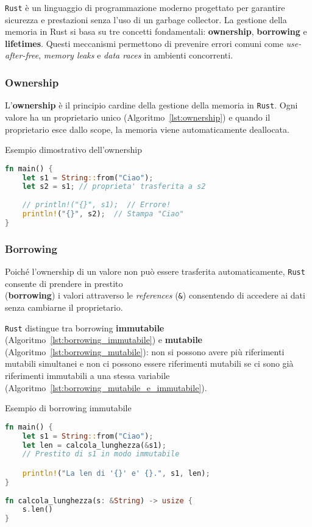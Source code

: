 \texttt{Rust} è un linguaggio di programmazione moderno progettato per garantire sicurezza e prestazioni senza l'uso di un garbage collector. La gestione della memoria in Rust si basa su tre concetti fondamentali: \textbf{ownership}, \textbf{borrowing} e \textbf{lifetimes}. Questi meccanismi permettono di prevenire errori comuni come \textit{use-after-free}, \textit{memory leaks} e \textit{data races} in ambienti concorrenti.

\subsubsection{Ownership}

L'\textbf{ownership} è il principio cardine della gestione della memoria in \texttt{Rust}. Ogni valore ha un proprietario unico (Algoritmo~\ref{lst:ownership}) e quando il proprietario esce dallo scope, la memoria viene automaticamente deallocata.

\begin{algorithm}[ht]
    \caption{Esempio dimostrativo dell'ownership}
    \label{lst:ownership}
    \begin{lstlisting}[language=Rust, style=colouredRust]
fn main() {
    let s1 = String::from("Ciao");
    let s2 = s1; // proprieta' trasferita a s2
   
    // println!("{}", s1);  // Errore!
    println!("{}", s2);  // Stampa "Ciao"
}
\end{lstlisting}
\end{algorithm}


\subsubsection{Borrowing}

Poiché l'ownership di un valore non può essere trasferita automaticamente, \texttt{Rust} consente di prendere in prestito \\(\textbf{borrowing}) i valori attraverso le \textit{references} (\texttt{\&}) consentendo di accedere ai dati senza cambiarne il proprietario.

\texttt{Rust} distingue tra borrowing \textbf{immutabile} (Algoritmo~\ref{lst:borrowing_immutabile}) e \textbf{mutabile} (Algoritmo~\ref{lst:borrowing_mutabile}): non si possono avere più riferimenti mutabili simultanei e non ci possono essere riferimenti mutabili se ci sono già riferimenti immutabili a una stessa variabile (Algoritmo~\ref{lst:borrowing_mutabile_e_immutabile}).

\begin{algorithm}[ht]
    \caption{Esempio di borrowing immutabile}
    \label{lst:borrowing_immutabile}
    \begin{lstlisting}[language=Rust, style=colouredRust]
fn main() {
    let s1 = String::from("Ciao");
    let len = calcola_lunghezza(&s1);
    // Prestito di s1 in modo immutabile

    println!("La len di '{}' e' {}.", s1, len);
}
        
fn calcola_lunghezza(s: &String) -> usize {
    s.len()
}
\end{lstlisting}
\end{algorithm}

